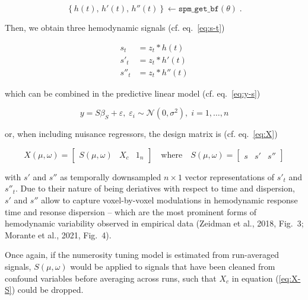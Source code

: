 \documentclass[a4paper,12pt]{article}
\begin{document}
\begin{equation} \label{eq:dHRF}
\left\lbrace h(t), \, h'(t), \, h''(t) \right\rbrace \leftarrow \mathtt{spm\_get\_bf}(\theta) \; .
\end{equation}

Then, we obtain three hemodynamic signals (cf. eq.~\ref{eq:s-t})

\vspace{-0.5em}
\begin{equation} \label{eq:s-ds-d2s-t}
\begin{split}
s_t &= z_t \ast h(t) \\
s'_t &= z_t \ast h'(t) \\
s''_t &= z_t \ast h''(t)
\end{split}
\end{equation}

which can be combined in the predictive linear model (cf. eq.~\ref{eq:y-s})

\begin{equation} \label{eq:y-S}
y = S \beta_S + \varepsilon, \; \varepsilon_i \sim \mathcal{N}(0, \sigma^2), \; i = 1,\ldots,n
\end{equation}

or, when including nuisance regressors, the design matrix is (cf. eq.~\ref{eq:X})

\begin{equation} \label{eq:X-S}
X(\mu,\omega) = \left[ \begin{matrix} S(\mu,\omega) & X_c & 1_n \end{matrix} \right] \quad \text{where} \quad S(\mu,\omega) = \left[ \begin{matrix} s & s' & s'' \end{matrix} \right]
\end{equation}

with $s'$ and $s''$ as temporally downsampled $n \times 1$ vector representations of $s'_t$ and $s''_t$. Due to their nature of being deriatives with respect to time and dispersion, $s'$ and $s''$ allow to capture voxel-by-voxel modulations in hemodynamic response time and resonse dispersion -- which are the most prominent forms of hemodynamic variability observed in empirical data (Zeidman et al., 2018, Fig.~3; Morante et al., 2021, Fig.~4).

Once again, if the numerosity tuning model is estimated from run-averaged signals, $S(\mu,\omega)$ would be applied to signals that have been cleaned from confound variables before averaging across runs, such that $X_c$ in equation (\ref{eq:X-S}) could be dropped.
\end{document}
